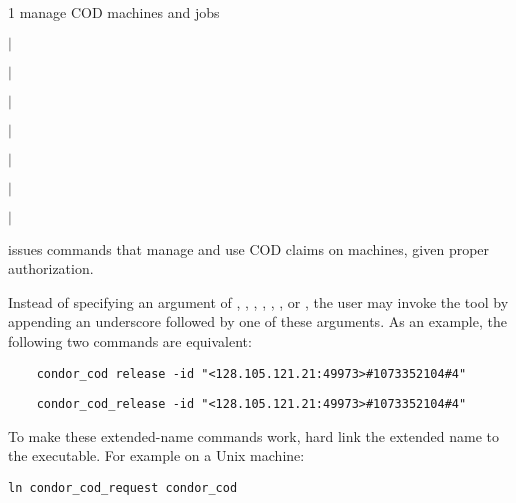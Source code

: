 \begin{ManPage}{\label{man-condor-cod}}{1}
{manage COD machines and jobs}

\Synopsis
{}
\ToolArgsBase

\ToolLocate
\Lbr {} $|$  \Rbr
{} 

 
\Lbr {} $|$  \Rbr
{}

 
\Lbr {} $|$  \Rbr
{}

 
\Lbr {} $|$  \Rbr
{}

 
\Lbr {} $|$  \Rbr

 
\Lbr {} $|$  \Rbr

 
\Lbr {} $|$  \Rbr


\Description

 issues commands that manage and use COD claims on
machines, given proper authorization.

Instead of specifying an argument of
, , , , ,
, or ,
the user may invoke the  tool by appending an
underscore followed by one of these arguments.
As an example, the following two commands are equivalent:
\begin{verbatim}
    condor_cod release -id "<128.105.121.21:49973>#1073352104#4"
\end{verbatim}
\begin{verbatim}
    condor_cod_release -id "<128.105.121.21:49973>#1073352104#4"
\end{verbatim}
To make these extended-name commands work,
hard link  the extended name to the  executable.
For example on a Unix machine:
\begin{verbatim}
ln condor_cod_request condor_cod
\end{verbatim}


\end{ManPage}
